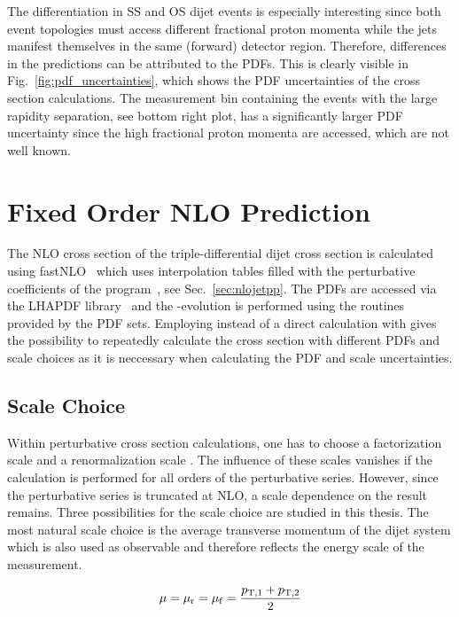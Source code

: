 The differentiation in SS and OS dijet events is especially interesting since
both event topologies must access different fractional proton momenta while the
jets manifest themselves in the same (forward) detector region. Therefore,
differences in the predictions can be attributed to the PDFs. This is clearly
visible in Fig.~\ref{fig:pdf_uncertainties}, which shows the PDF uncertainties of
the cross section calculations. The measurement bin containing the events with
the large rapidity separation, see bottom right plot, has a significantly larger
PDF uncertainty since the high fractional proton momenta are accessed,
which are not well known.

\section{Fixed Order NLO Prediction}

The NLO cross section of the triple-differential dijet cross section is
calculated using fastNLO~\cite{Kluge:2006xs,Britzger:2012bs} which uses
interpolation tables filled with the perturbative coefficients of the \NLOJETPP
program~\cite{Nagy:2003tz}, see Sec.~\ref{sec:nlojetpp}. The PDFs are accessed
via the LHAPDF library~\cite{Whalley:2005nh,Buckley:2014ana} and the
\as-evolution is performed using the routines provided by the PDF sets.
Employing \fastNLO instead of a direct calculation with \NLOJETPP gives the
possibility to repeatedly calculate the cross section with  different PDFs and
scale choices as it is neccessary when calculating the PDF and scale
uncertainties.

\subsection{Scale Choice}
\label{sec:scale_coice}

Within perturbative cross section calculations, one has to choose a
factorization scale \muf and a renormalization scale \mur. The influence of
these scales vanishes if the calculation is performed for all orders of the
perturbative series.  However, since the perturbative series is truncated at
NLO, a scale dependence on the result remains. Three possibilities for the scale
choice are studied in this thesis.  The most natural scale choice is the average
transverse momentum  of the dijet system which is also used as observable and
therefore reflects the energy scale of the measurement.

\begin{equation*}
    \mu = \mu_{\mathrm{r}} = \mu_{\mathrm{f}} = \frac{p_{\mathrm{T},1} + p_{\mathrm{T},2}}{2}
\end{equation*}

